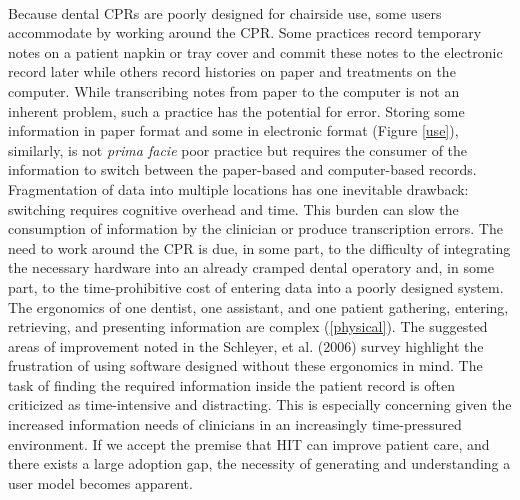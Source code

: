 \documentclass[11pt]{article}
\begin{document}
\\ Because dental CPRs are poorly designed for chairside use, some users accommodate by working around the CPR. Some practices record temporary notes on a patient napkin or tray cover and commit these notes to the electronic record later while others record histories on paper and treatments on the computer. While transcribing notes from paper to the computer is not an inherent problem, such a practice has the potential for error. Storing some information in paper format and some in electronic format (Figure \ref{use}), similarly, is not \emph{prima facie} poor practice but requires the consumer of the information to switch between the paper-based and computer-based records. Fragmentation of data into multiple locations has one inevitable drawback: switching requires cognitive overhead and time. This burden can slow the consumption of information by the clinician or produce transcription errors\cite{Salvucci2009Toward-a-unifie}. The need to work around the CPR is due, in some part, to the difficulty of integrating the necessary hardware into an already cramped dental operatory\cite{Schleyer2004Why-integration,Unthank2004Designing-your-} and, in some part, to the time-prohibitive cost of entering data into a poorly designed system. The ergonomics of one dentist, one assistant, and one patient gathering, entering, retrieving, and presenting information are complex (\ref{physical}). The suggested areas of improvement noted in the Schleyer, et al. (2006) survey highlight the frustration of using software designed without these ergonomics in mind. The task of finding the required information inside the patient record is often criticized as time-intensive and distracting\cite{Nygren1998Helping-clinici}. This is especially concerning given the increased information needs of clinicians in an increasingly time-pressured environment. If we accept the premise that HIT can improve patient care, and there exists a large adoption gap, the necessity of generating and understanding a user model becomes apparent.
\end{document}
